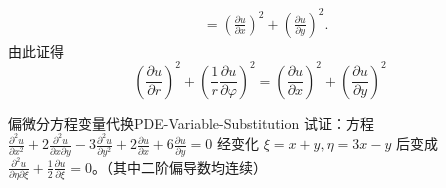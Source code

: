 \begin{myproof}
\begin{equation}
\begin{aligned}
                                                                                                                          & = \left( \frac{\partial u}{\partial x} \right)^2 + \left( \frac{\partial u}{\partial y} \right)^2.
        \end{aligned}
    \end{equation}
    由此证得
    \begin{equation}
        \boxed{\left(\frac{\partial u}{\partial r}\right)^2 + \left(\frac{1}{r} \frac{\partial u}{\partial \varphi}\right)^2 = \left(\frac{\partial u}{\partial x}\right)^2 + \left(\frac{\partial u}{\partial y}\right)^2}
    \end{equation}
\end{myproof}

\begin{problem}{偏微分方程变量代换}{PDE-Variable-Substitution}
    试证：方程 $\frac{\partial^2 u}{\partial x^2} + 2 \frac{\partial^2 u}{\partial x \partial y} - 3 \frac{\partial^2 u}{\partial y^2} + 2 \frac{\partial u}{\partial x} + 6 \frac{\partial u}{\partial y} = 0$ 经变化 $\xi = x + y, \eta = 3x - y$ 后变成 $\frac{\partial^2 u}{\partial \eta \partial \xi} + \frac{1}{2} \frac{\partial u}{\partial \xi} = 0$。（其中二阶偏导数均连续）
\end{problem}

